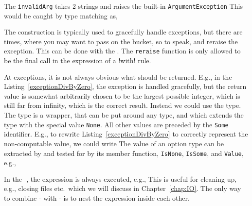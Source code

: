 The \lstinline!invalidArg! takes 2 strings and raises the built-in \lstinline!ArgumentException!
%
%
This would be caught by type matching as,
%
%

The  construction is typically used to gracefully handle exceptions, but there are times, where you may want to pass on the bucket, so to speak, and reraise the exception. This can be done with the .
%
%
The \lstinline!reraise! function is only allowed to be the final call in the expression of a \keyword!with! rule.

At exceptions, it is not always obvious what should be returned. E.g., in the Listing~\ref{exceptionDivByZero}, the exception is handled gracefully, but the return value is somewhat arbitrarily chosen to be the largest possible integer, which is still far from infinity, which is the correct result. Instead we could use the  type. The  type is a wrapper, that can be put around any type, and which extends the type with the special value \lstinline!None!. All other values are preceded by the \lstinline!Some! identifier. E.g., to rewrite Listing~\ref{exceptionDivByZero} to correctly represent the non-computable value, we could write
%
%
The value of an option type can be extracted by and tested for by its member function, \lstinline!IsNone!, \lstinline!IsSome!, and \lstinline!Value!, e.g.,
%
%

In the -, the  expression is always executed, e.g.,
%
%
This is useful for cleaning up, e.g., closing files etc.\ which we will discuss in Chapter~\ref{chap:IO}. The only way to combine - with - is to nest the expression inside each other.

\begin{comment}
\begin{itemize}
\item exn type Spec-4.0 Chapter 18.1
\item Spec-4.0 Section 18.2.8
\end{itemize}
\end{comment}



